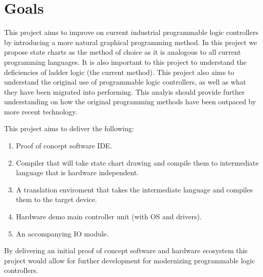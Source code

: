 \section{Goals}

This project aims to improve on current industrial programmable logic controllers by introducing a more natural graphical programming method. In this project we propose state charts as the method of choice as it is analogous to all current programming languages. It is also important to this project to understand the deficiencies of ladder logic (the current method). This project also aims to understand the original use of programmable logic controllers, as well as what they have been migrated into performing. This analyis should provide further understanding on how the original programming methods have been outpaced by more recent technology.

This project aims to deliver the following:
\begin{enumerate}
\item Proof of concept software IDE.
\item Compiler that will take state chart drawing and compile them to intermediate language that is hardware independent.
\item A translation enviroment that takes the intermediate language and compiles them to the target device. 
\item Hardware demo main controller unit (with OS and drivers).
\item An accompanying IO module. %
\end{enumerate}
By delivering an initial proof of concept software and hardware ecosystem this project would allow for further development for modernizing programmable logic controllers.

